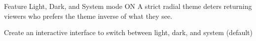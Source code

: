 \documentclass[7px]{article}
\begin{document}
\frontmatter
{Feature}
{Light, Dark, and System mode}
{ON}
{A strict radial theme deters returning viewers who prefers the theme inverse of what they see.}

\strategy
{
  Create an interactive interface to switch between light, dark, and system (default)
}
{
}
{
}
{
}

\deploy
{

}
{

}

\report
{

}
\end{document}
